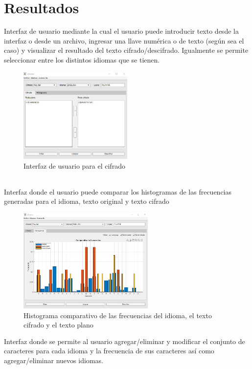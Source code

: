 \documentclass[10pt]{article}
\begin{document}
\section{Resultados}
\justify
Interfaz de usuario mediante la cual el usuario puede introducir texto desde la interfaz o desde un archivo, ingresar una llave numérica o de texto (según sea el caso) y visualizar el resultado del texto cifrado/descifrado.
Igualmente se permite seleccionar entre los distintos idiomas que se tienen.\\
\begin{figure}[!ht]
  \centering
  \includegraphics[width=0.5\textwidth]{GUI_1PF}
  \caption{Interfaz de usuario para el cifrado}
  \label{fig_sim}
\end{figure}
\\
Interfaz donde el usuario puede comparar los histogramas de las frecuencias generadas para el idioma, texto original y texto cifrado
\begin{figure}[!ht]
  \centering
  \includegraphics[width=0.6\textwidth]{GUI_2PF}
  \caption{Histograma comparativo de las frecuencias del idioma, el texto cifrado y el texto plano}
  \label{fig_sim}
\end{figure}
\newpage
\justify
Interfaz donde se permite al usuario agregar/eliminar y modificar el conjunto de caracteres para cada idioma y la frecuencia de sus caracteres así como agregar/eliminar nuevos idiomas.\\
\end{document}
